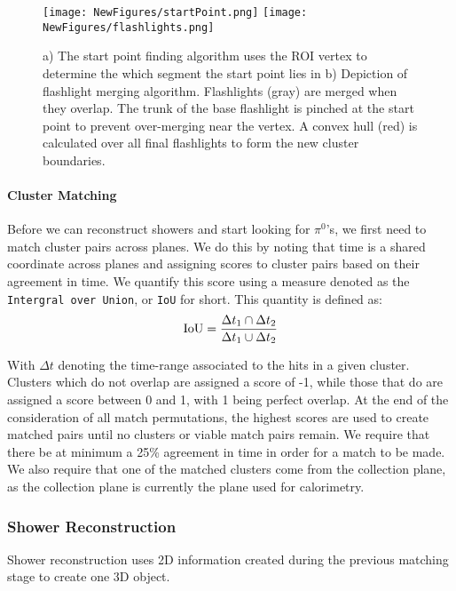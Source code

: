 \documentclass[12pt]{article}
\begin{document}
\begin{figure}[h!]
\centering
\texttt{[image: NewFigures/startPoint.png]}
\hspace{3 mm}
\texttt{[image: NewFigures/flashlights.png]}
\caption{a) The start point finding algorithm uses the ROI vertex to determine the which segment the start point lies in   b) Depiction of flashlight merging algorithm. Flashlights (gray) are merged when they overlap. The trunk of the base flashlight is pinched at the start point to prevent over-merging near the vertex. A convex hull (red) is calculated over all final flashlights to form the new cluster boundaries. }
\label{fig:flashlights}
\end{figure}

\paragraph{Cluster Matching}
Before we can reconstruct showers and start looking for $\pi^0$'s, we first need to match cluster pairs across planes. We do this by noting that time is a shared coordinate across planes and assigning scores to cluster pairs based on their agreement in time. We quantify this score using a measure denoted as the \texttt{Intergral over Union}, or \texttt{IoU} for short. This quantity is defined as:
\begin{equation}
  {\rm IoU} = \frac{ \Delta t_1 \cap \Delta t_2  }{ \Delta t_1 \cup \Delta t_2 }
\end{equation}

With $\Delta t$ denoting the time-range associated to the hits in a given cluster.  Clusters which do not overlap are assigned a score of -1, while those that do are assigned a score between 0 and 1, with 1 being perfect overlap. At the end of the consideration of all match permutations, the highest scores are used to create matched pairs until no clusters or viable match pairs remain. We require that there be at minimum a 25\% agreement in time in order for a match to be made. We also require that one of the matched clusters come from the collection plane, as the collection plane is currently the plane used for calorimetry. 

\subsubsection{Shower Reconstruction}
Shower reconstruction uses 2D information created during the previous matching stage to create one 3D object. 
\end{document}
